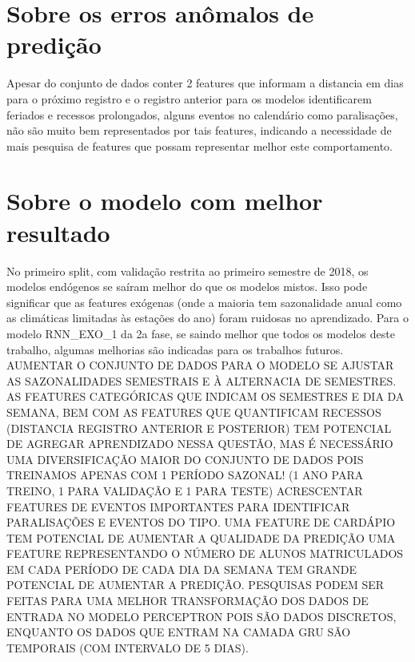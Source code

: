 \documentclass[	12pt, Times, openright, twoside, a4paper, english, brazil]{abntex2}
\begin{document}
    \section{Sobre os erros anômalos de predição}
        Apesar do conjunto de dados conter 2 features que informam a distancia em dias para o próximo registro e o registro anterior para os modelos identificarem feriados e recessos prolongados, alguns eventos no calendário como paralisações, não são muito bem representados por tais features, indicando a necessidade de mais pesquisa de features que possam representar melhor este comportamento.

    \section{Sobre o modelo com melhor resultado}
        No primeiro split, com validação restrita ao primeiro semestre de 2018, os modelos endógenos se saíram melhor do que os modelos mistos. Isso pode significar que as features exógenas (onde a maioria tem sazonalidade anual como as climáticas limitadas às estações do ano) foram ruidosas no aprendizado.
        Para o modelo RNN\_EXO\_1 da 2a fase, se saindo melhor que todos os modelos deste trabalho, algumas melhorias são indicadas para os trabalhos futuros.\newline
        AUMENTAR O CONJUNTO DE DADOS PARA O MODELO SE AJUSTAR AS SAZONALIDADES SEMESTRAIS E À ALTERNACIA DE SEMESTRES. AS FEATURES CATEGÓRICAS QUE INDICAM OS SEMESTRES E DIA DA SEMANA, BEM COM AS FEATURES QUE QUANTIFICAM RECESSOS (DISTANCIA REGISTRO ANTERIOR E POSTERIOR) TEM POTENCIAL DE AGREGAR APRENDIZADO NESSA QUESTÃO, MAS É NECESSÁRIO UMA DIVERSIFICAÇÃO MAIOR DO CONJUNTO DE DADOS POIS TREINAMOS APENAS COM 1 PERÍODO SAZONAL! (1 ANO PARA TREINO, 1 PARA VALIDAÇÃO E 1 PARA TESTE)\newline
        ACRESCENTAR FEATURES DE EVENTOS IMPORTANTES PARA IDENTIFICAR PARALISAÇÕES E EVENTOS DO TIPO.\newline
        UMA FEATURE DE CARDÁPIO TEM POTENCIAL DE AUMENTAR A QUALIDADE DA PREDIÇÃO\newline
        UMA FEATURE REPRESENTANDO O NÚMERO DE ALUNOS MATRICULADOS EM CADA PERÍODO DE CADA DIA DA SEMANA TEM GRANDE POTENCIAL DE AUMENTAR A PREDIÇÃO.\newline
        PESQUISAS PODEM SER FEITAS PARA UMA MELHOR TRANSFORMAÇÃO DOS DADOS DE ENTRADA NO MODELO PERCEPTRON POIS SÃO DADOS DISCRETOS, ENQUANTO OS DADOS QUE ENTRAM NA CAMADA GRU SÃO TEMPORAIS (COM INTERVALO DE 5 DIAS).\newline
\end{document}
